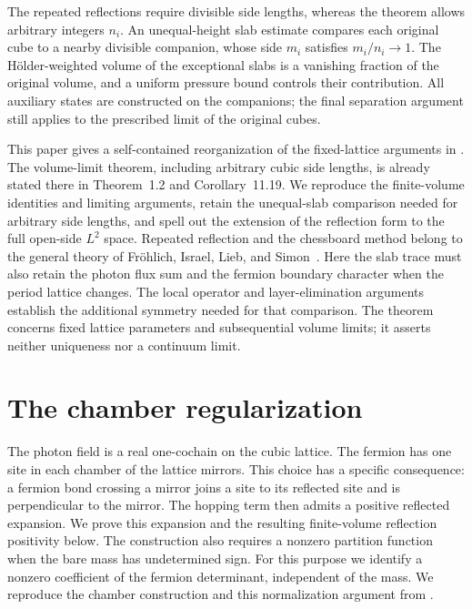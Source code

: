 \documentclass[11pt,letterpaper,reqno]{amsart}
\begin{document}
The repeated reflections require divisible side lengths, whereas
the theorem allows arbitrary integers $n_i$. An unequal-height
slab estimate compares each original cube to a nearby divisible
companion, whose side $m_i$ satisfies $m_i/n_i\to1$. The H\"older-weighted
volume of the exceptional slabs is a vanishing fraction of the original
volume, and a uniform pressure bound controls their contribution. All auxiliary states
are constructed on the companions; the final separation argument
still applies to the prescribed limit of the original cubes.


This paper gives a self-contained reorganization of the fixed-lattice
arguments in \cite[Sections~3--11]{ChamberQED}. The volume-limit
theorem, including arbitrary cubic side lengths, is already stated
there in Theorem~1.2 and Corollary~11.19. We reproduce the finite-volume
identities and limiting arguments, retain the unequal-slab comparison
needed for arbitrary side lengths, and spell out the extension of the
reflection form to the full open-side $L^2$ space. Repeated reflection and the
chessboard method belong to the general theory of Fr\"ohlich, Israel,
Lieb, and Simon~\cite[Section~4]{FILS1978}. Here the slab trace must also
retain the photon flux sum and the fermion boundary character when
the period lattice changes. The local operator and layer-elimination
arguments establish the additional symmetry needed for that comparison.
The theorem concerns fixed lattice parameters and subsequential volume
limits; it asserts neither uniqueness nor a continuum limit.
\section{The chamber regularization}\label{sec:regularization}

The photon field is a real one-cochain on the cubic lattice. The fermion
has one site in each chamber of the lattice mirrors. This choice has a
specific consequence: a fermion bond crossing a mirror joins a site to
its reflected site and is perpendicular to the mirror. The hopping term
then admits a positive reflected expansion. We prove this expansion and
the resulting finite-volume reflection positivity below. The construction
also requires a nonzero partition function when the bare mass has
undetermined sign. For this purpose we identify a nonzero coefficient
of the fermion determinant, independent of the mass. We reproduce the
chamber construction and this normalization argument from
\cite[Sections~2.1--2.3, 3.1--3.5 and 4.1--4.4]{ChamberQED}.
\end{document}
